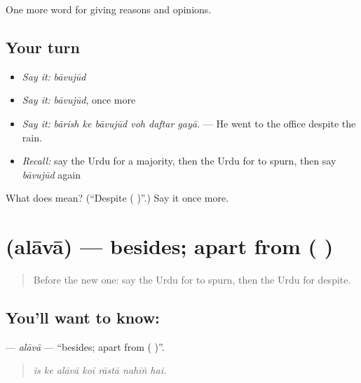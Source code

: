 \begin{grammarlens}[title={What you've built}]
One more word for giving reasons and opinions.
\end{grammarlens}

\subsection*{Your turn}
\begin{itemize}
\raggedright
  \item \emph{Say it:} \emph{bāvujūd}
  \item \emph{Say it:} \emph{bāvujūd}, once more
  \item \emph{Say it:} \emph{bārish ke bāvujūd voh daftar gayā.} — He went to the office despite the rain.
  \item \emph{Recall:} say the Urdu for a majority, then the Urdu for to spurn, then say \emph{bāvujūd} again
\end{itemize}

\begin{tcolorbox}[breakable,colback=teal!4,colframe=teal!35!black,title={Before you move on}]
What does  mean? (\textquotedblleft{}Despite ( )\textquotedblright{}.) Say it once more.
\end{tcolorbox}
\section[\texorpdfstring{\ur{علاوہ} (alāvā)}{علاوہ (alāvā)}]{ (alāvā) — besides; apart from ( )}

\label{lesson:UR-C359-alava}



\begin{quote}
Before the new one: say the Urdu for to spurn, then the Urdu for despite.
\end{quote}

\subsection*{You'll want to know: }
\textbf{} — \emph{alāvā} — \textquotedblleft{}besides; apart from ( )\textquotedblright{}.

\begin{quote}
      
\end{quote}

\begin{quote}
\emph{is ke alāvā koī rāstā nahīṅ hai.}
\end{quote}


